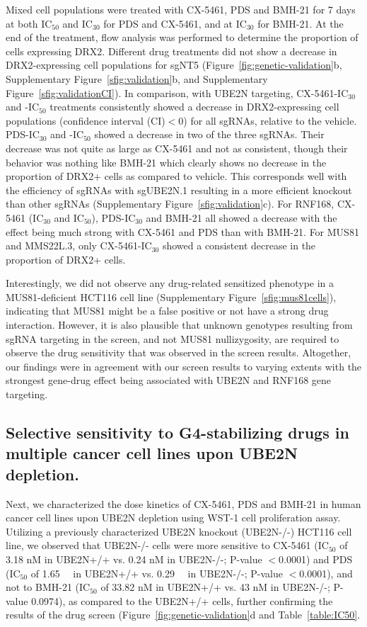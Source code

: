 Mixed cell populations were treated with CX-5461, PDS and BMH-21 for 7 days at both IC$_{50}$ and IC$_{30}$ for PDS and CX-5461, and at IC$_{30}$ for BMH-21. At the end of the treatment, flow analysis was performed to determine the proportion of cells expressing DRX2. 
Different drug treatments did not show a decrease in DRX2-expressing cell populations for sgNT5 (Figure~\ref{fig:genetic-validation}b, Supplementary Figure~\ref{sfig:validation}b, and Supplementary Figure~\ref{sfig:validationCI}). 
In comparison, with UBE2N targeting, CX-5461-IC$_{30}$ and -IC$_{50}$ treatments consistently showed a decrease in DRX2-expressing cell populations (confidence interval (CI)$<$0) for all sgRNAs, relative to the vehicle. PDS-IC$_{30}$ and -IC$_{50}$ showed a decrease in two of the three sgRNAs. Their decrease was not quite as large as CX-5461 and not as consistent, though their behavior was nothing like BMH-21 which clearly shows no decrease in the proportion of DRX2+ cells as compared to vehicle. This corresponds well with the efficiency of sgRNAs with sgUBE2N.1 resulting in a more efficient knockout than other sgRNAs (Supplementary Figure~\ref{sfig:validation}c).
For RNF168, CX-5461 (IC$_{30}$ and IC$_{50}$), PDS-IC$_{30}$ and BMH-21 all showed a decrease with the effect being much strong with CX-5461 and PDS than with BMH-21. 
For MUS81 and MMS22L.3, only CX-5461-IC$_{30}$ showed a consistent decrease in the proportion of DRX2+ cells.  

Interestingly, we did not observe any drug-related sensitized phenotype in a MUS81-deficient HCT116 cell line (Supplementary Figure~\ref{sfig:mus81cells}), indicating that MUS81 might be a false positive or not have a strong drug interaction. However, it is also plausible that unknown genotypes resulting from sgRNA targeting in the screen, and not MUS81 nullizygosity, are required to observe the drug sensitivity that was observed in the screen results. Altogether, our findings were in agreement with our screen results to varying extents with the strongest gene-drug effect being associated with UBE2N and RNF168 gene targeting. 

\subsection{Selective sensitivity to G4-stabilizing drugs in multiple cancer cell lines upon UBE2N depletion.}
Next, we characterized the dose kinetics of CX-5461, PDS and BMH-21 in human cancer cell lines upon UBE2N depletion using WST-1 cell proliferation assay. Utilizing a previously characterized UBE2N knockout (UBE2N-/-) HCT116 cell line\cite{Thorslund2015}, we observed that UBE2N-/- cells were more sensitive to CX-5461 (IC$_{50}$ of 3.18 nM in UBE2N+/+ vs. 0.24 nM in UBE2N-/-; P-value $<$0.0001) and PDS (IC$_{50}$ of \SI{1.65}{\micro\Molar} in UBE2N+/+ vs. \SI{0.29}{\micro\Molar} in UBE2N-/-; P-value $<$0.0001), and not to BMH-21 (IC$_{50}$ of 33.82 nM in UBE2N+/+ vs. 43 nM in UBE2N-/-; P-value 0.0974), as compared to the UBE2N+/+ cells, further confirming the results of the drug screen (Figure~\ref{fig:genetic-validation}d and Table~\ref{table:IC50}.

